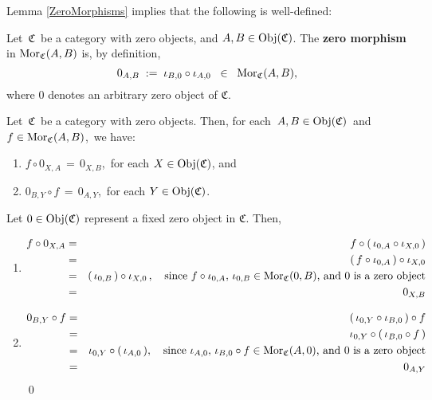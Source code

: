 \vskip 0.5cm
\noindent
Lemma \ref{ZeroMorphisms} implies that the following is well-defined:


\vskip 0.5cm
\begin{definition}
\mbox{}
\vskip 0.15cm
\noindent
Let \,$\mathfrak{C}$\, be a category with zero objects, and $A, B \in \textnormal{Obj}(\mathfrak{C})$.
The \textbf{zero morphism} in $\textnormal{Mor}_{\mathfrak{C}}(A,B)$ is, by definition,
\begin{equation*}
0_{A,B}
\; := \;
	\iota_{B,0} \circ \iota_{A,0}
\;\; \in \;\;
	\textnormal{Mor}_{\mathfrak{C}}(A,B),
\end{equation*}
where $0$ denotes an arbitrary zero object of $\mathfrak{C}$.
\end{definition}


\vskip 0.5cm
\begin{lemma}
\mbox{}
\vskip 0.15cm
\noindent
Let \,$\mathfrak{C}$\, be a category with zero objects.
Then, for each \,$A, B \in \textnormal{Obj}(\mathfrak{C})$\, and \,$f \in \textnormal{Mor}_{\mathfrak{C}}(A,B)$,\, we have:
\begin{enumerate}
\item
	$f \circ 0_{X,A} \,=\, 0_{X,B}$,\, for each $X \in \textnormal{Obj}(\mathfrak{C})$, and
\item
	$0_{B,Y} \circ f \,=\, 0_{A,Y}$,\, for each $Y \in \textnormal{Obj}(\mathfrak{C})$.
\end{enumerate}
\end{lemma}
\proof
Let $0 \in \textnormal{Obj}(\mathfrak{C})$ represent a fixed zero object in $\mathfrak{C}$.
Then,
\begin{enumerate}
\item
	\begin{eqnarray*}
	f \circ 0_{X,A}
	& = &
		f \circ (\,\iota_{0,A} \circ \iota_{X,0}\,)
	\\
	& = &
		(\,f \circ \iota_{0,A}\,) \circ \iota_{X,0}
	\\
	& = &
		(\,\iota_{0,B}\,) \circ \iota_{X,0}\,,
		\quad
		\textnormal{since $f \circ \iota_{0,A},\, \iota_{0,B} \in \textnormal{Mor}_{\mathfrak{C}}(0,B)$, and $0$ is a zero object}
	\\
	& = &
		0_{X,B}
	\end{eqnarray*}
\item
	\begin{eqnarray*}
	0_{B,Y} \circ f
	& = &
		(\,\iota_{0,Y} \circ \iota_{B,0}\,) \circ f
	\\
	& = &
		\iota_{0,Y} \circ (\,\iota_{B,0} \circ f\,)
	\\
	& = &
		\iota_{0,Y} \circ (\,\iota_{A,0}\,),
		\quad
		\textnormal{since $\iota_{A,0},\, \iota_{B,0} \circ f \in \textnormal{Mor}_{\mathfrak{C}}(A,0)$, and $0$ is a zero object}
	\\
	& = &
		0_{A,Y}
	\end{eqnarray*}
	\vskip -0.5cm
	\qed
\end{enumerate}

